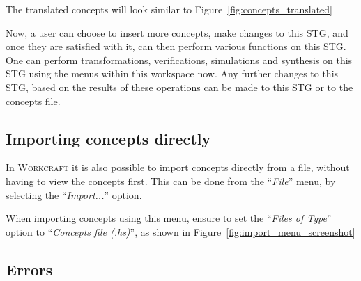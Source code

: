 \documentclass[british,conference,compsoc]{IEEEtran}
\newcommand{\noun}[1]{\textsc{#1}}
\begin{document}
%
%
%

The translated concepts will look similar to Figure~\ref{fig:concepts_translated}

Now, a user can choose to insert more concepts, make changes to this STG, and once they are satisfied with it, can then perform various functions on this STG. One can perform 
transformations, verifications, simulations and synthesis on this STG using the menus within this workspace now. Any further changes to this STG, based on the results of these operations 
can be made to this STG or to the concepts file. 

\subsection{Importing concepts directly}

In \noun{Workcraft} it is also possible to import concepts directly from a file, without having to view the concepts first. 
This can be done from the ``\emph{File}'' menu, by selecting the ``\emph{Import...}'' option. 

%
%
%

When importing concepts using this menu, ensure to set the ``\emph{Files of Type}'' option to ``\emph{Concepts file (.hs)}'', as shown in Figure~\ref{fig:import_menu_screenshot}

\subsection{Errors}
\end{document}
